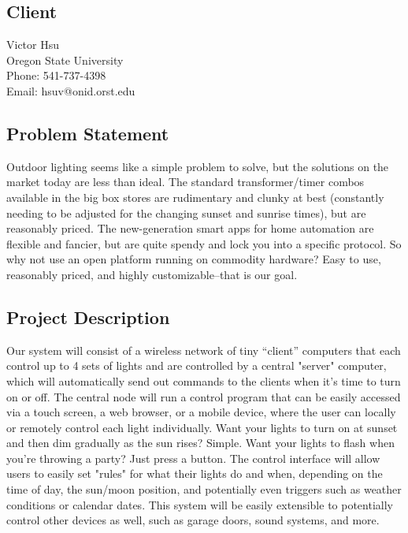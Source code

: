 \subsection{Client}

Victor Hsu\\
Oregon State University\\
Phone: 541-737-4398\\
Email: hsuv@onid.orst.edu

\subsection{Problem Statement}

Outdoor lighting seems like a simple problem to solve, but the solutions on the
market today are less than ideal.  The standard transformer/timer combos
available in the big box stores are rudimentary and clunky at best (constantly
needing to be adjusted for the changing sunset and sunrise times), but are
reasonably priced. The new-generation smart apps for home automation are
flexible and fancier, but are quite spendy and lock you into a specific
protocol.  So why not use an open platform running on commodity hardware?  Easy
to use, reasonably priced, and highly customizable--that is our goal. \\

\subsection{Project Description}

Our system will consist of a wireless network of tiny “client” computers that
each control up to 4 sets of lights and are controlled by a central "server"
computer, which will automatically send out commands to the clients when it's
time to turn on or off.  The central node will run a control program that can
be easily accessed via a touch screen, a web browser, or a mobile device, where
the user can locally or remotely control each light individually.  Want your
lights to turn on at sunset and then dim gradually as the sun rises?  Simple.
Want your lights to flash when you're throwing a party?  Just press a button.
The control interface will allow users to easily set "rules" for what their
lights do and when, depending on the time of day, the sun/moon position, and
potentially even triggers such as weather conditions or calendar dates.  This
system will be easily extensible to potentially control other devices as well,
such as garage doors, sound systems, and more. \\
\hypersetup{linkcolor=blue}
